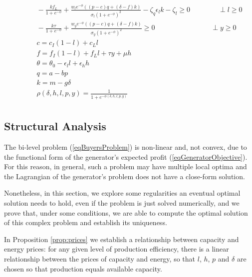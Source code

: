 \documentclass[informs]{informs3}
\begin{document}
\begin{subequations}
\begin{align}
    & \qquad -\frac{k f_{L}}{1+e^{-\phi}}+{\frac{w_l e^{-\phi} \left(\left(p-c\right)q  +\left(\delta-f\right)k\right)}{\sigma_{l}(1+e^{-\phi})^{2}}}-\zeta_q \epsilon_l k -\zeta_l \geq 0 \qquad\qquad \perp l\geq 0\\
    &\qquad  -\frac{k\tau}{1+e^{-\phi}}+ {\frac{w_y e^{-\phi} \left(\left(p-c\right)q +\left(\delta-f\right)k\right)}{\sigma_{y}(1+e^{-\phi})^{2}}} \geq 0 \qquad\qquad\qquad\qquad \perp y\geq 0\\  
	&\qquad c = c_I(1-l)+c_Ll \label{eqBuyerMarginalCost2}\\
	&\qquad f = f_I(1-l)+f_Ll+\tau y+\mu h \label{eqBuyerFixedCost2}\\
	&\qquad \theta = \theta_0-\epsilon_l l  +\epsilon_h h \label{eqBuyerTheta2}\\
	&\qquad  q = a - bp \label{eqBuyerEnergyDemand2}\\	
	&\qquad  k = m -g \delta \label{eqBuyerCapacityDemand2}\\
	&\qquad	 \rho(\delta, h, l, p,y)=\frac{1}{1+e^{-\phi(\delta, h, l, p, y)}} \label{eqGeneratorProbability2}\\
	\end{align}
\end{subequations}

    


\subsection{Structural Analysis}\label{Section_analytics}

The bi-level problem (\ref{eqBuyersProblem}) is non-linear and, not convex, due to the functional form of the generator's expected profit (\ref{eqGeneratorObjective}). For this reason, in general, such a problem may have multiple local optima and the Lagrangian of the generator's problem does not have a close-form solution. 

Nonetheless, in this section, we explore some regularities an eventual optimal solution needs to hold, even if the problem is just solved numerically, and we prove that, under some conditions, we are able to compute the optimal solution of this complex problem and establish its uniqueness. 

In  Proposition \ref{prop:prices} we establish a relationship between capacity and energy prices: for any given level of production efficiency, there is a linear relationship between the prices of capacity and energy, so that $l$, $h$, $p$ and $\delta$ are chosen so that production equals available capacity. 
\end{document}
